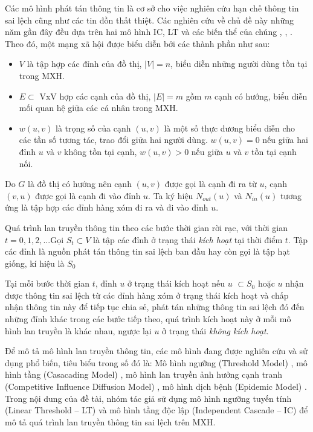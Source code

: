 Các mô hình phát tán thông tin là cơ sở cho việc nghiên cứu hạn chế thông tin sai lệch cũng như các tin đồn thất thiệt. Các nghiên cứu về chủ đề này những năm gần đây đều dựa trên hai mô hình IC, LT và các biến thể của chúng \cite{kemple2}, \cite{Golden}, \cite{Carnes}. Theo đó, một mạng xã hội được biểu diễn bởi các thành phần như sau:
\begin {itemize}
	\item $V$ là tập hợp các đỉnh của đồ thị, $|V| = n$, biểu diễn những người dùng tồn tại trong MXH.

	\item $E \subset$ VxV hợp các cạnh của đồ thị, $|E| = m$ gồm $m$ cạnh có hướng, biểu diễn mối quan hệ giữa các cá nhân trong MXH.

	\item $w(u,v)$ là trọng số của cạnh $(u, v)$ là một số thực dương biểu diễn cho các tần số tương tác, trao đổi giữa hai người dùng. $w(u, v) = 0$ nếu giữa hai đỉnh $u$ và $v$ không tồn tại cạnh, $w(u, v) > 0$ nếu giữa $u$ và $v$ tồn tại cạnh nối.
\end {itemize}
Do $G$ là đồ thị có hướng nên cạnh $(u,v)$ được gọi là cạnh đi ra từ $u$, cạnh $(v,u)$ được gọi là cạnh đi vào đỉnh $u$. Ta ký hiệu $N_{out}(u)$ và $N_{in}(u)$ tương ứng là tập hợp các đỉnh hàng xóm đi ra và đi vào đỉnh $u$.

Quá trình lan truyền thông tin theo các bước thời gian rời rạc, với thời gian $t = 0, 1, 2, ... $Gọi $S_{t}\subset V$ là tập các đỉnh ở trạng thái {\itshape kích hoạt} tại thời điểm $t$. Tập các đỉnh là nguồn phát tán thông tin sai lệch ban đầu hay còn gọi là tập hạt giống, kí hiệu là $S_{0}$

Tại mỗi bước thời gian $t$, đỉnh $u$ ở trạng thái kích hoạt nếu $u$ $\subset S_{0}$ hoặc $u$ nhận được thông tin sai lệch từ các đỉnh hàng xóm ở trạng thái kích hoạt và chấp nhận thông tin này để tiếp tục chia sẻ, phát tán những thông tin sai lệch đó đến những đỉnh khác trong các bước tiếp theo, quá trình kích hoạt này ở mỗi mô hình lan truyền là khác nhau, ngược lại $u$ ở trạng thái {\itshape không kích hoạt}.

Để mô tả mô hình lan truyền thông tin, các mô hình đang được nghiên cứu và sử dụng phổ biến, tiêu biểu trong số đó là: Mô hình ngưỡng (Threshold Model) \cite{kemple2}, mô hình tầng (Casacading Model) \cite{Golden}, mô hình lan truyền ảnh hưởng cạnh tranh (Competitive Influence Diffusion Model) \cite{Carnes}, mô hình dịch bệnh (Epidemic Model) \cite{leskovec}. Trong nội dung của đề tài, nhóm tác giả sử dụng mô hình ngưỡng tuyến tính (Linear Threshold – LT) và mô hình tầng độc lập (Independent Cascade – IC) \cite{kemple1} để mô tả quá trình lan truyền thông tin sai lệch trên MXH.

